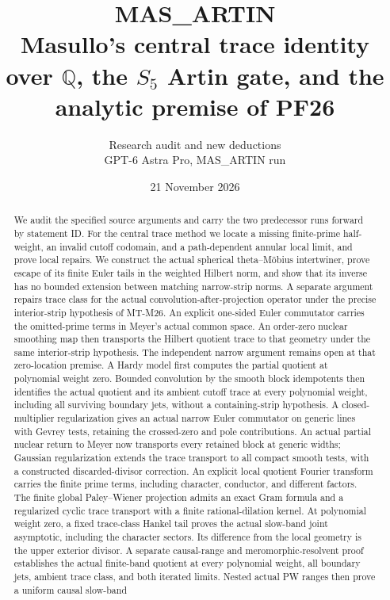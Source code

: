 \documentclass[11pt,a4paper]{article}
\title{MAS\_ARTIN\\[5pt]\large Masullo's central trace identity over
$\mathbb Q$, the $S_5$ Artin gate, and the analytic premise of PF26}
\author{Research audit and new deductions\\GPT-6 Astra Pro, MAS\_ARTIN run}
\date{21 November 2026\\\small\RunStatus}
\begin{document}
\maketitle
\begin{abstract}
We audit the specified source arguments and carry the two predecessor
runs forward by statement ID. For the central trace method we locate
a missing finite-prime half-weight, an invalid cutoff codomain, and
a path-dependent annular local limit, and prove local repairs. We
construct the actual spherical theta--M\"obius intertwiner, prove
escape of its finite Euler tails in the weighted Hilbert norm, and
show that its inverse has no bounded extension between matching
narrow-strip norms. A separate argument repairs trace class for
the actual convolution-after-projection operator under the precise
interior-strip hypothesis of MT-M26. An explicit one-sided Euler
commutator carries the omitted-prime terms in Meyer's actual common
space. An order-zero nuclear smoothing map then transports the
Hilbert quotient trace to that geometry under the same interior-strip
hypothesis. The independent narrow argument remains open at that
zero-location premise. A Hardy model first computes the partial
quotient at polynomial weight zero. Bounded convolution by the
smooth block idempotents then identifies the actual quotient and
its ambient cutoff trace at every polynomial weight, including all
surviving boundary jets, without a containing-strip hypothesis.
A closed-multiplier regularization gives an actual narrow
Euler commutator on generic lines with Gevrey tests, retaining
the crossed-zero and pole contributions. An actual partial nuclear
return to Meyer now transports every retained block at generic
widths; Gaussian regularization extends the trace transport to
all compact smooth tests, with a constructed discarded-divisor
correction. An explicit local quotient Fourier transform carries
the finite prime terms, including character, conductor, and
different factors. The finite global Paley--Wiener projection
admits an exact Gram formula and a regularized cyclic trace
transport with a finite rational-dilation kernel. At polynomial
weight zero, a fixed trace-class Hankel tail proves the actual
slow-band joint asymptotic, including the character sectors. Its
difference from the local geometry is the upper exterior divisor.
A separate causal-range and meromorphic-resolvent proof establishes
the actual finite-band quotient at every polynomial weight, all
boundary jets, ambient trace class, and both iterated limits.
Nested actual PW ranges then prove a uniform causal slow-band

\end{abstract}
\end{document}
